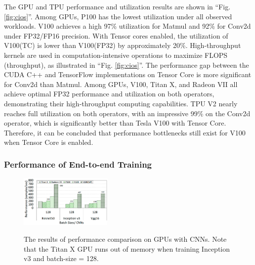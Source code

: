 The GPU and TPU performance and utilization results are shown in ``Fig. \ref{fig:cios}''.
Among GPUs, P100 has the lowest utilization under all observed workloads.
V100 achieves a high 97\% utilization for Matmul and 92\% for Conv2d under FP32/FP16 precision.
With Tensor cores enabled, the utilization of V100(TC) is lower than V100(FP32) by approximately 20\%.
High-throughput kernels are used in computation-intensive operations to maximize FLOPS (throughput), as illustrated in ``Fig. \ref{fig:cios}''.
The performance gap between the CUDA C++ and TensorFlow implementations on Tensor Core is more significant for Conv2d than Matmul.
Among GPUs, V100, Titan X, and Radeon VII all achieve optimal FP32 performance and utilization on both operators, demonstrating their high-throughput computing capabilities.
TPU V2 nearly reaches full utilization on both operators, with an impressive 99\% on the Conv2d operator, which is significantly better than Tesla V100 with Tensor Core.
Therefore, it can be concluded that performance bottlenecks still exist for V100 when Tensor Core is enabled.

\subsubsection{Performance of End-to-end Training}

\begin{figure}[htbp!]
    \centering
    {    \includegraphics[width=0.4\textwidth]{images/gpucnn}}
    \caption{The results of performance comparison on GPUs with CNNs. Note that the Titan X GPU runs out of memory when training Inception v3 and batch-size = 128.}
    \label{fig:cnn}
\end{figure}

